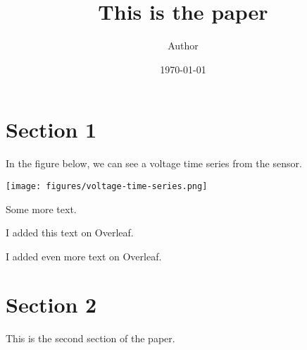 \documentclass[11pt]{article}
\title{This is the paper}
\author{ Author }
\date{\today}
\begin{document}
\maketitle
\pagebreak



\section{Section 1}

In the figure below,
we can see a voltage time series from the sensor.

\texttt{[image: figures/voltage-time-series.png]}

Some more text.

I added this text on Overleaf.

I added even more text on Overleaf.

\pagebreak
\section{Section 2}

This is the second section of the paper.

\end{document}
